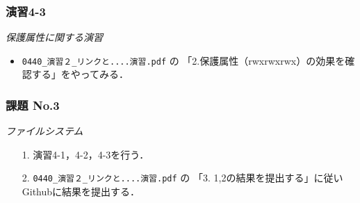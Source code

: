 \documentclass{beamer}                 %
\begin{document}

\begin{frame}[fragile]
  \frametitle{演習4-3}
  \emph{保護属性に関する演習}
\begin{itemize}
\item \texttt{0440\_演習２\_リンクと....演習.pdf} の
「2.保護属性（rwxrwxrwx）の効果を確認する」をやってみる．
\end{itemize}
\end{frame}

\begin{frame}[fragile]
  \frametitle{課題 No.3}
  \emph{ファイルシステム}
\begin{enumerate}
\item[1.] 演習4-1，4-2，4-3を行う．
\item[2.] \texttt{0440\_演習２\_リンクと....演習.pdf} の
「3. 1,2の結果を提出する」に従いGithubに結果を提出する．
\end{enumerate}
\end{frame}
\end{document}

